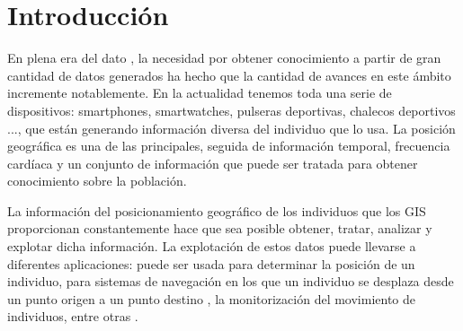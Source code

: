 
\chapter{Introducción}
En plena era del dato \cite{Borkovich01}, la necesidad por obtener conocimiento a partir 
de gran cantidad de datos generados ha hecho que la cantidad de avances en este 
ámbito incremente notablemente. En la actualidad tenemos toda una serie de 
dispositivos: smartphones, smartwatches, pulseras deportivas, chalecos deportivos ..., 
que están generando información diversa del individuo que lo usa. La posición 
geográfica es una de las principales, seguida de información temporal, frecuencia 
cardíaca y un conjunto de información que puede ser tratada para obtener 
conocimiento sobre la población. 

La información del posicionamiento geográfico  de los individuos que los \ac{GIS} 
proporcionan constantemente hace que sea posible obtener, tratar, analizar y explotar 
dicha información. La explotación de estos datos puede llevarse a diferentes 
aplicaciones: puede ser usada para determinar la posición de un individuo, para 
sistemas de navegación en los que un individuo se desplaza desde un punto origen a 
un punto destino , la monitorización del movimiento de individuos, entre otras 
\cite{GPS01}. 

